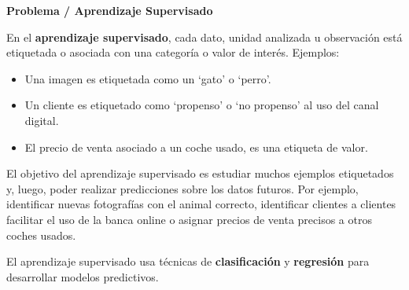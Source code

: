 \documentclass[]{book}
\providecommand{\tightlist}{%
  \setlength{\itemsep}{0pt}\setlength{\parskip}{0pt}}
\begin{document}
\textbf{Problema / Aprendizaje Supervisado}

En el \textbf{aprendizaje supervisado}, cada dato, unidad analizada u observación está etiquetada o asociada con una categoría o valor de interés. Ejemplos:

\begin{itemize}
\tightlist
\item
  Una imagen es etiquetada como un `gato' o `perro'.
\item
  Un cliente es etiquetado como `propenso' o `no propenso' al uso del canal digital.
\item
  El precio de venta asociado a un coche usado, es una etiqueta de valor.
\end{itemize}

El objetivo del aprendizaje supervisado es estudiar muchos ejemplos etiquetados y, luego, poder realizar predicciones sobre los datos futuros. Por ejemplo, identificar nuevas fotografías con el animal correcto, identificar clientes a clientes facilitar el uso de la banca online o asignar precios de venta precisos a otros coches usados.

El aprendizaje supervisado usa técnicas de \textbf{clasificación} y \textbf{regresión} para desarrollar modelos predictivos.
\end{document}
